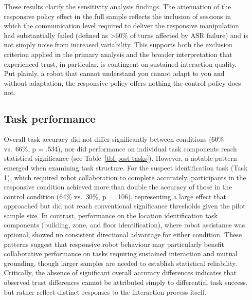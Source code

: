 \documentclass[
]{article}
\begin{document}
These results clarify the sensitivity analysis findings. The attenuation
of the responsive policy effect in the full sample reflects the
inclusion of sessions in which the communication level required to
deliver the responsive manipulation had substantially failed (defined as
\textgreater60\% of turns affected by ASR failure) and is not simply
noise from increased variability. This supports both the exclusion
criterion applied in the primary analysis and the broader interpretation
that experienced trust, in particular, is contingent on sustained
interaction quality. Put plainly, a robot that cannot understand you
cannot adapt to you and without adaptation, the responsive policy offers
nothing the control policy does not.

\subsection{Task performance}\label{task-performance}

Overall task accuracy did not differ significantly between conditions
(60\% vs.~66\%, p = .534), nor did performance on individual task
components reach statistical significance (see
Table~\ref{tbl-post-tasks}). However, a notable pattern emerged when
examining task structure. For the suspect identification task (Task 1),
which required robot collaboration to complete accurately, participants
in the responsive condition achieved more than double the accuracy of
those in the control condition (64\% vs.~30\%, p = .106), representing a
large effect that approached but did not reach conventional significance
thresholds given the pilot sample size. In contrast, performance on the
location identification task components (building, zone, and floor
identification), where robot assistance was optional, showed no
consistent directional advantage for either condition. These patterns
suggest that responsive robot behaviour may particularly benefit
collaborative performance on tasks requiring sustained interaction and
mutual grounding, though larger samples are needed to establish
statistical reliability. Critically, the absence of significant overall
accuracy differences indicates that observed trust differences cannot be
attributed simply to differential task success, but rather reflect
distinct responses to the interaction process itself.
\end{document}
